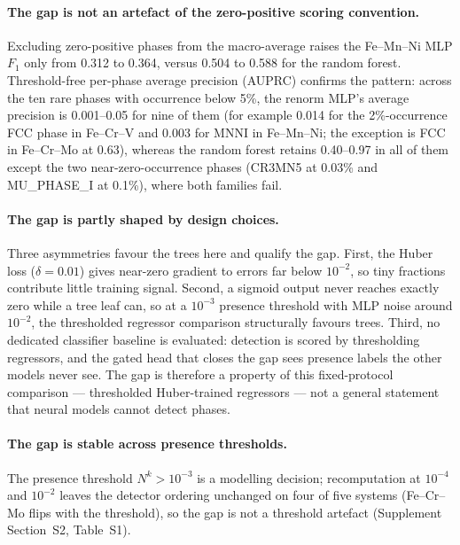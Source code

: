 \documentclass[preprint,12pt,authoryear]{elsarticle}
\newcommand{\Np}[1]{N^{#1}}
\begin{document}
\paragraph{The gap is not an artefact of the zero-positive scoring
convention.}
Excluding zero-positive phases from the macro-average raises the Fe--Mn--Ni
MLP $F_1$ only from 0.312 to 0.364, versus 0.504 to 0.588 for the random
forest. Threshold-free per-phase average precision (AUPRC) confirms the
pattern: across the ten rare phases with occurrence below 5\%, the renorm
MLP's average precision is 0.001--0.05 for nine of them (for example 0.014
for the 2\%-occurrence FCC phase in Fe--Cr--V and 0.003 for MNNI in
Fe--Mn--Ni; the exception is FCC in Fe--Cr--Mo at 0.63), whereas the random
forest retains 0.40--0.97 in all of them except the two near-zero-occurrence
phases (CR3MN5 at 0.03\% and MU\_PHASE\_I at 0.1\%), where both families
fail.

\paragraph{The gap is partly shaped by design choices.}
Three asymmetries favour the trees here and qualify the gap. First, the
Huber loss ($\delta = 0.01$) gives near-zero gradient to errors far below
$10^{-2}$, so tiny fractions contribute little training signal. Second, a
sigmoid output never reaches exactly zero while a tree leaf can, so at a
$10^{-3}$ presence threshold with MLP noise around $10^{-2}$, the
thresholded regressor comparison structurally favours trees. Third, no
dedicated classifier baseline is evaluated: detection is scored by
thresholding regressors, and the gated head that closes the gap sees
presence labels the other models never see. The gap is therefore a property
of this fixed-protocol comparison --- thresholded Huber-trained regressors
--- not a general statement that neural models cannot detect phases.

\paragraph{The gap is stable across presence thresholds.}
The presence threshold $\Np{k} > 10^{-3}$ is a modelling decision;
recomputation at $10^{-4}$ and $10^{-2}$ leaves the detector ordering
unchanged on four of five systems (Fe--Cr--Mo flips with the threshold),
so the gap is not a threshold artefact (Supplement Section~S2,
Table~S1).
\end{document}
